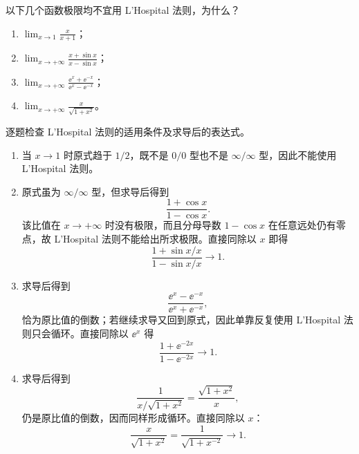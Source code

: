 \begin{xexercise}[1]
以下几个函数极限均不宜用 L'Hospital 法则，为什么？
  \begin{enumerate}[label=(\arabic*)]
    \item $\displaystyle\lim_{x\to1}\frac{x}{x+1}$；
    \item $\displaystyle\lim_{x\to+\infty}\frac{x+\sin x}{x-\sin x}$；
    \item $\displaystyle\lim_{x\to+\infty}\frac{\ee^x+\ee^{-x}}{\ee^x-\ee^{-x}}$；
    \item $\displaystyle\lim_{x\to+\infty}\frac{x}{\sqrt{1+x^2}}$。
  \end{enumerate}
\end{xexercise}
\begin{xsolution}
逐题检查 L'Hospital 法则的适用条件及求导后的表达式。
\begin{enumerate}[label=(\arabic*)]
  \item 当 $x\to1$ 时原式趋于 $1/2$，既不是 $0/0$ 型也不是 $\infty/\infty$ 型，因此不能使用 L'Hospital 法则。

  \item 原式虽为 $\infty/\infty$ 型，但求导后得到
  \[
    \frac{1+\cos x}{1-\cos x}.
  \]
  该比值在 $x\to+\infty$ 时没有极限，而且分母导数 $1-\cos x$ 在任意远处仍有零点，故 L'Hospital 法则不能给出所求极限。直接同除以 $x$ 即得
  \[
    \frac{1+\sin x/x}{1-\sin x/x}\to1.
  \]

  \item 求导后得到
  \[
    \frac{\ee^x-\ee^{-x}}{\ee^x+\ee^{-x}},
  \]
  恰为原比值的倒数；若继续求导又回到原式，因此单靠反复使用 L'Hospital 法则只会循环。直接同除以 $\ee^x$ 得
  \[
    \frac{1+\ee^{-2x}}{1-\ee^{-2x}}\to1.
  \]

  \item 求导后得到
  \[
    \frac{1}{x/\sqrt{1+x^2}}=\frac{\sqrt{1+x^2}}x,
  \]
  仍是原比值的倒数，因而同样形成循环。直接同除以 $x$：
  \[
    \frac{x}{\sqrt{1+x^2}}=\frac1{\sqrt{1+x^{-2}}}\to1.
  \]
\end{enumerate}
\end{xsolution}


